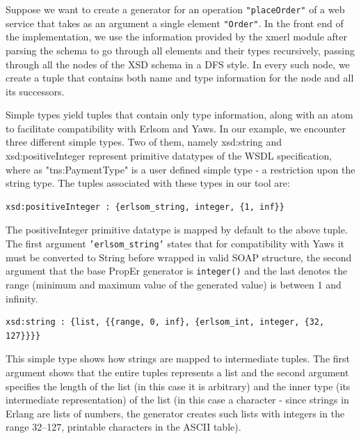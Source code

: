 \documentclass[submission,copyright,a4]{eptcs}
\begin{document}

Suppose we want to create a generator for an operation \texttt{"placeOrder"} of a 
web service that takes as an argument a single element \texttt{"Order"}. In the 
front end of the implementation, we use the information provided by the xmerl 
module after parsing the schema to go through all elements and their types recursively, 
passing through all the nodes of the XSD schema in a DFS style. In every such node, 
we create a tuple that contains both name and type information for the node and 
all its successors. 

Simple types yield tuples that contain only type information, along with an atom 
to facilitate compatibility with Erlsom and Yaws. In our example, we encounter 
three different simple types. Two of them, namely xsd:string and xsd:positiveInteger 
represent primitive datatypes of the WSDL specification, where as "tns:PaymentType" 
is a user defined simple type - a restriction upon the string type. The tuples 
associated with these types in our tool are:

\begin{lstlisting}
xsd:positiveInteger : {erlsom_string, integer, {1, inf}}
\end{lstlisting}

The positiveInteger primitive datatype is mapped by default to the above tuple. 
The first argument \texttt{'erlsom\_string'} states that for compatibility with 
Yaws it must be converted to String before wrapped in valid SOAP structure, 
the second argument that the base PropEr generator is \texttt{integer()} and the 
last denotes the range (minimum and maximum value of the generated value) is 
between 1 and infinity. 

\begin{lstlisting}
xsd:string : {list, {{range, 0, inf}, {erlsom_int, integer, {32, 127}}}}
\end{lstlisting}

This simple type shows how strings are mapped to intermediate tuples. The first 
argument shows that the entire tuples represents a list and the second argument 
specifies the length of the list (in this case it is arbitrary) and the inner type 
(its intermediate representation) of the list (in this case a character - since 
strings in Erlang are lists of numbers, the generator creates such lists with 
integers in the range 32--127, printable characters in the ASCII table).
\end{document}
